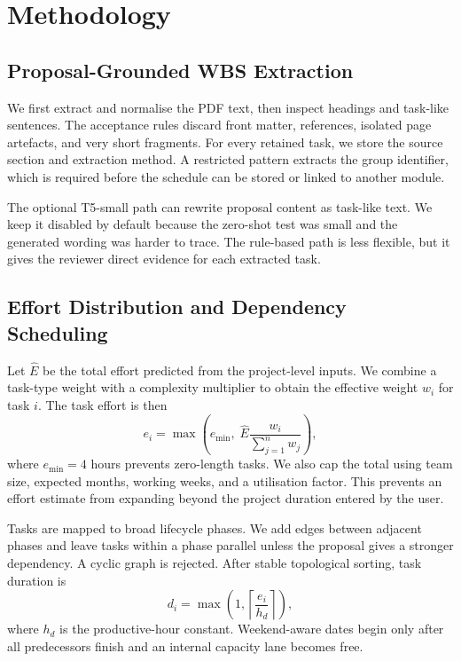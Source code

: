 \documentclass[conference]{IEEEtran}
\begin{document}
\section{Methodology}

\subsection{Proposal-Grounded WBS Extraction}
We first extract and normalise the PDF text, then inspect headings and task-like sentences. The acceptance rules discard front matter, references, isolated page artefacts, and very short fragments. For every retained task, we store the source section and extraction method. A restricted pattern extracts the group identifier, which is required before the schedule can be stored or linked to another module.

The optional T5-small path can rewrite proposal content as task-like text. We keep it disabled by default because the zero-shot test was small and the generated wording was harder to trace. The rule-based path is less flexible, but it gives the reviewer direct evidence for each extracted task.

\subsection{Effort Distribution and Dependency Scheduling}
Let $\widehat{E}$ be the total effort predicted from the project-level inputs. We combine a task-type weight with a complexity multiplier to obtain the effective weight $w_i$ for task $i$. The task effort is then
\begin{equation}
e_i=\max\left(e_{\min},\;\widehat{E}\frac{w_i}{\sum_{j=1}^{n}w_j}\right),
\label{eq:effort}
\end{equation}
where $e_{\min}=4$ hours prevents zero-length tasks. We also cap the total using team size, expected months, working weeks, and a utilisation factor. This prevents an effort estimate from expanding beyond the project duration entered by the user.

Tasks are mapped to broad lifecycle phases. We add edges between adjacent phases and leave tasks within a phase parallel unless the proposal gives a stronger dependency. A cyclic graph is rejected. After stable topological sorting, task duration is
\begin{equation}
d_i=\max\left(1,\left\lceil \frac{e_i}{h_d}\right\rceil\right),
\end{equation}
where $h_d$ is the productive-hour constant. Weekend-aware dates begin only after all predecessors finish and an internal capacity lane becomes free.
\end{document}
